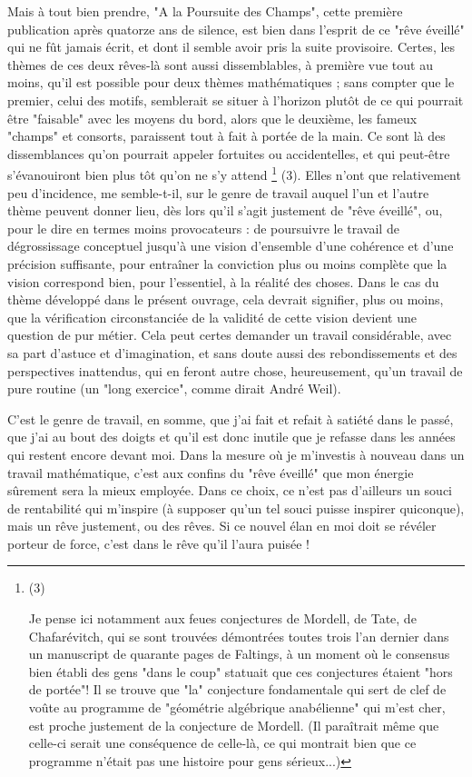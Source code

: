 Mais à tout bien prendre, "A la Poursuite des Champs", cette première publication après quatorze ans de silence, est bien dans l'esprit de ce "rêve éveillé" qui ne fût jamais écrit, et dont il semble avoir pris la suite provisoire. Certes, les thèmes de ces deux rêves-là sont aussi dissemblables, à première vue tout au moins, qu'il est possible pour deux thèmes mathématiques ; sans compter que le premier, celui des motifs, semblerait se situer à l'horizon plutôt de ce qui pourrait être "faisable" avec les moyens du bord, alors que le deuxième, les fameux "champs" et consorts, paraissent tout à fait à portée de la main. Ce sont là des dissemblances qu'on pourrait appeler fortuites ou accidentelles, et qui peut-être s'évanouiront bien plus tôt qu'on ne s'y attend \footnote{(3)\par Je pense ici notamment aux feues conjectures de Mordell, de Tate, de Chafarévitch, qui se sont trouvées démontrées toutes trois l'an dernier dans un manuscript de quarante pages de Faltings, à un moment où le consensus bien établi des gens "dans le coup" statuait que ces conjectures étaient "hors de portée"! Il se trouve que "la" conjecture fondamentale qui sert de clef de voûte au programme de "géométrie algébrique anabélienne" qui m'est cher, est proche justement de la conjecture de Mordell. (Il paraîtrait même que celle-ci serait une conséquence de celle-là, ce qui montrait bien que ce programme n'était pas une histoire pour gens sérieux...)} (3). Elles n'ont que relativement peu d'incidence, me semble-t-il, sur le genre de travail auquel l'un et l'autre thème peuvent donner lieu, dès lors qu'il s'agit justement de "rêve éveillé", ou, pour le dire en termes moins provocateurs : de poursuivre le travail de dégrossissage conceptuel jusqu'à une vision d'ensemble d'une cohérence et d'une précision suffisante, pour entraîner la conviction plus ou moins complète que la vision correspond bien, pour l'essentiel, à la réalité des choses. Dans le cas du thème développé dans le présent ouvrage, cela devrait signifier, plus ou moins, que la vérification circonstanciée de la validité de cette vision devient une question de pur métier. Cela peut certes demander un travail considérable, avec sa part d'astuce et d'imagination, et sans doute aussi des rebondissements et des perspectives inattendus, qui en feront autre chose, heureusement, qu'un travail de pure routine (un "long exercice", comme dirait André Weil).

C'est le genre de travail, en somme, que j'ai fait et refait à satiété dans le passé, que j'ai au bout des doigts et qu'il est donc inutile que je refasse dans les années qui restent encore devant moi. Dans la mesure où je m'investis à nouveau dans un travail mathématique, c'est aux confins du "rêve éveillé" que mon énergie sûrement sera la mieux employée. Dans ce choix, ce n'est pas d'ailleurs un souci de rentabilité qui m'inspire (à supposer qu'un tel souci puisse inspirer quiconque), mais un rêve justement, ou des rêves. Si ce nouvel élan en moi doit se révéler porteur de force, c'est dans le rêve qu'il l'aura puisée !

